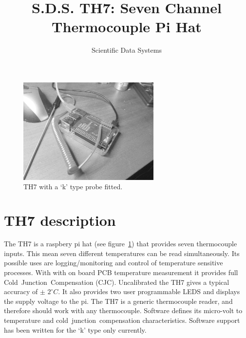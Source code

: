 \documentclass[10pt,foldmark]{leaflet}
\title{S.D.S. TH7: Seven Channel Thermocouple  Pi Hat}
\author{Scientific Data Systems}
\begin{document}
\maketitle

\begin{figure}
 \centering
 \includegraphics[width=200pt]{./TH7_0p4_IMG_20181010_184556D.jpg}
 \caption{TH7 with a `k' type probe fitted.}
 \label{fig:th7}
\end{figure}



\section{TH7 description}
The TH7 is a raspbery pi hat (see figure~\ref{fig:th7})  that
provides seven thermocouple inputs. This mean seven different temperatures can be read
simultaneously. Its possible uses are 
logging/monitoring and control of temperature sensitive processes.
%
With with on board PCB temperature measurement
it provides full Cold~Junction~Compensation (CJC).
Uncalibrated the TH7 gives a typical accuracy of $\pm$ ${2}^{\circ} C$.
It also provides two user programmable LEDS and displays the supply voltage to the pi.
\clearpage
The TH7 is a generic thermocouple reader, and therefore should work with any thermocouple.
Software defines its micro-volt to temperature and cold~junction~compensation characteristics.
Software support has been written for the `k' type only currently.

\end{document}
